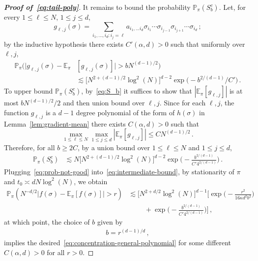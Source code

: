 \documentclass[reqno,11pt]{amsart}
\numberwithin{equation}{section}
\theoremstyle{definition}{
\newtheorem{example}[theorem]{Example}
\newtheorem{definition}[theorem]{Definition}
\newtheorem*{definition*}{Definition}
\newtheorem{problem}[theorem]{Problem}
\newtheorem{question}[theorem]{Question}
\newtheorem{remark}[theorem]{Remark}
}
\begin{document}
\begin{proof}[\textbf{\emph{Proof of~\eqref{eq:tail-poly}}}]
 
It remains to bound the probability $\mathbb P_{\pi} (S_b^c)$. Let, for every $1\leq \ell\leq N$, $1\leq j\leq d$, 
\[g_{\ell,j}(\sigma)= \sum_{i_1,...,i_d:i_j=\ell} a_{i_1,...i_d} \sigma_{i_1}\cdots \sigma_{i_{j-1}}\sigma_{i_{j+1}}\cdots \sigma_{i_d}\,;
\] 
by the inductive hypothesis there exists $C'(\alpha,d)>0$ such that uniformly over $\ell,j$,
\begin{align*}
\mathbb P_{\pi} (|g_{\ell,j}(\sigma)-\mathbb E_{\pi} & [g_{\ell,j}(\sigma)] |  > bN^{(d-1)/2}) \\ 
& \lesssim \big[N^{2+(d-1)/2}  \log^2 ( N)\big]^{d-2} \exp \Big ( - {b^{2/{(d-1)}}}/C'\Big)\,.
\end{align*}
To upper bound $\mathbb P _{\pi} (S_b^c)$, by~\eqref{eq:S_b} it suffices to show that $|\mathbb E_{\pi} [g_{\ell,j}]|$ is at most $bN^{(d-1)/2}/2$ and then union bound over $\ell,j$. Since for each $\ell,j$, the function $g_{\ell,j}$ is a $d-1$ degree polynomial of the form of $h(\sigma)$ in Lemma~\ref{lem:gradient-mean} there exists $C(\alpha,d)>0$ such that  
\[\max_{1\leq \ell \leq N} \max_{1\leq j \leq d} |\mathbb E_\pi [g_{\ell,j}]|  \leq C N^{(d-1)/2}\,.
\]
Therefore, for all $b\geq 2C $, by a union bound over $1\leq \ell\leq N$ and $1\leq j\leq d$, 
\begin{align}\label{eq:prob-not-good}
\mathbb P_{\pi} (S_b^c) & \lesssim N \big[N^{2+(d-1)/2} \log^2 ( N)\big]^{d-2} \exp\bigg ( -\frac{b^{2/{(d-1)}}}{C'4^{2/(d-1)}}\bigg)\,.
\end{align}
Plugging~\eqref{eq:prob-not-good} into~\eqref{eq:intermediate-bound}, by stationarity of $\pi$ and $t_0 \asymp dN \log^2 ( N)$,
we obtain
\begin{align*}
\mathbb P_{\pi} (N^{-d/2} |f(\sigma)- \mathbb E_{\pi} [f(\sigma)]|>r) & \lesssim \big[N^{2+d/2} \log^2 ( N)\big]^{d-1} \bigg[ \exp \bigg(-\frac{r^2}{16\kappa d^2 b^2}\bigg) \nonumber \\ 
&\,\,\,\,\,\,\,\,\,\,\,\,\,\,+\exp \bigg ( -\frac{b^{2/{(d-1)}}}{C'4^{2/(d-1)}}\bigg)\bigg]\,,
\end{align*}
at which point, the choice of $b$ given by 
\begin{align*}
b= r^{(d-1)/d}\,,
\end{align*}
implies the desired~\eqref{eq:concentration-general-polynomial} for some different $C(\alpha,d)>0$ for all $r>0$.
\end{proof}
\end{document}
